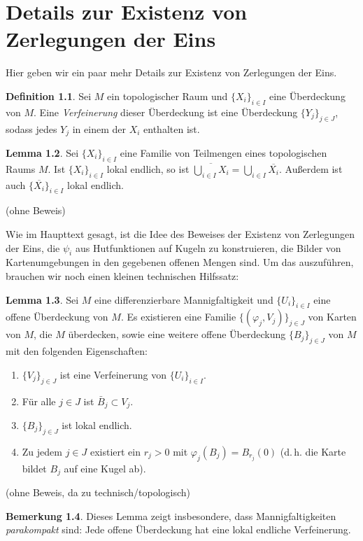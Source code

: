 \documentclass[a4paper]{scrbook}
\numberwithin{equation}{chapter}
\theoremstyle{definition}
\newtheorem{defn}{Definition}[section]
\newtheorem{lemma}[defn]{Lemma}
\newtheorem{bem}[defn]{Bemerkung}
\begin{document}
\chapter{Details zur Existenz von Zerlegungen der Eins}
\label{appendix:details_zerl_eins}
Hier geben wir ein paar mehr Details zur Existenz von Zerlegungen der Eins.
\begin{defn}
	Sei $M$ ein topologischer Raum und $\{X_i\}_{i\in I}$ eine Überdeckung von $M$. Eine \emph{Verfeinerung} dieser Überdeckung ist eine Überdeckung $\{Y_j\}_{j\in J}$, sodass jedes $Y_j$ in einem der $X_i$ enthalten ist.
\end{defn}
\begin{lemma} \label{lemma:lok_endl_abschluss}
	Sei $\{X_i\}_{i\in I}$ eine Familie von Teilmengen eines topologischen Raums $M$. Ist $\{X_i\}_{i\in I}$ lokal endlich, so ist $\overline{\bigcup_{i\in I} X_i} = \bigcup_{i\in I} \overline{X_i}$. Außerdem ist auch $\{\overline{X_i}\}_{i\in I}$ lokal endlich.

	(ohne Beweis)
\end{lemma}
Wie im Haupttext gesagt, ist die Idee des Beweises der Existenz von Zerlegungen der Eins, die $\psi_i$ aus Hutfunktionen auf Kugeln zu konstruieren, die Bilder von Kartenumgebungen in den gegebenen offenen Mengen sind. Um das auszuführen, brauchen wir noch einen kleinen technischen Hilfssatz:
\begin{lemma}
	Sei $M$ eine differenzierbare Mannigfaltigkeit und $\{U_i\}_{i\in I}$ eine offene Überdeckung von $M$. Es existieren eine Familie $\{(\varphi_j,V_j)\}_{j\in J}$ von Karten von $M$, die $M$ überdecken, sowie eine weitere offene Überdeckung $\{B_j\}_{j\in J}$ von $M$ mit den folgenden Eigenschaften:
	\begin{enumerate}[label=(\roman*)]
		\item $\{V_j\}_{j\in J}$ ist eine Verfeinerung von $\{U_i\}_{i\in I}$.
		\item Für alle $j\in J$ ist $\bar B_j \subset V_j$.
		\item $\{B_j\}_{j\in J}$ ist lokal endlich.
		\item Zu jedem $j\in J$ existiert ein $r_j > 0$ mit $\varphi_j(B_j) = B_{r_j}(0)$ (d.\,h. die Karte bildet $B_j$ auf eine Kugel ab).
	\end{enumerate}

	(ohne Beweis, da zu technisch/topologisch)
\end{lemma}
\begin{bem}
	Dieses Lemma zeigt insbesondere, dass Mannigfaltigkeiten \emph{parakompakt} sind: Jede offene Überdeckung hat eine lokal endliche Verfeinerung.
\end{bem}
\end{document}
